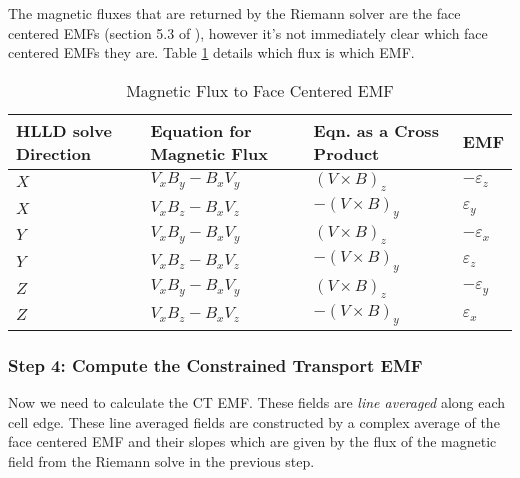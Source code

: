 The magnetic fluxes that are returned by the Riemann solver are the face centered EMFs (section 5.3 of \cite{stone_athena_2008}), however it's not immediately clear which face centered EMFs they are. Table \ref{table:emf} details which flux is which EMF.

\begin{table}[!ht]
    \centering
        \caption{Magnetic Flux to Face Centered EMF}
    \begin{tabular}{|l|l|l|l|}
    \hline
        HLLD solve Direction & Equation for Magnetic Flux & Eqn. as a Cross Product & EMF \\ \hline
        $ X $ & $ V_x B_y - B_x V_y $ & $  (V \times B)_z $ & $ -\varepsilon_z $ \\ \hline
        $ X $ & $ V_x B_z - B_x V_z $ & $ -(V \times B)_y $ & $  \varepsilon_y $ \\ \hline
        $ Y $ & $ V_x B_y - B_x V_y $ & $  (V \times B)_z $ & $ -\varepsilon_x $ \\ \hline
        $ Y $ & $ V_x B_z - B_x V_z $ & $ -(V \times B)_y $ & $  \varepsilon_z $ \\ \hline
        $ Z $ & $ V_x B_y - B_x V_y $ & $  (V \times B)_z $ & $ -\varepsilon_y $ \\ \hline
        $ Z $ & $ V_x B_z - B_x V_z $ & $ -(V \times B)_y $ & $  \varepsilon_x $ \\ \hline
    \end{tabular}
    \label{table:emf}
\end{table}

\subsubsection{Step 4: Compute the Constrained Transport EMF}
\label{vlct:emf}

Now we need to calculate the CT EMF. These fields are \emph{line averaged} along each cell edge. These line averaged fields are constructed by a complex average of the face centered EMF and their slopes which are given by the flux of the magnetic field from the Riemann solve in the previous step.

